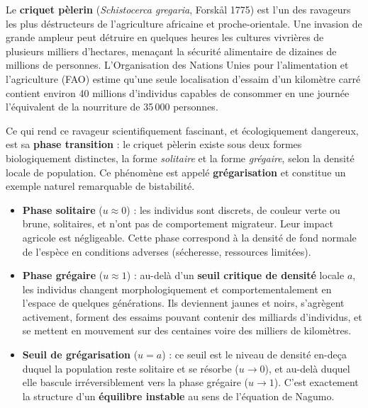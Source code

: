 \documentclass[11pt,a4paper]{report}
\begin{document}
Le \textbf{criquet p\`elerin} (\textit{Schistocerca gregaria}, Forsk\aa{}l 1775) est
l'un des ravageurs les plus d\'estructeurs de l'agriculture africaine et proche-orientale.
Une invasion de grande ampleur peut d\'etruire en quelques heures les cultures vivri\`eres
de plusieurs milliers d'hectares, mena\c{c}ant la s\'ecurit\'e alimentaire de dizaines de
millions de personnes. L'Organisation des Nations Unies pour l'alimentation et l'agriculture
(FAO) estime qu'une seule localisation d'essaim d'un kilom\`etre carr\'e contient environ
40 millions d'individus capables de consommer en une journ\'ee l'\'equivalent de la
nourriture de 35\,000 personnes.

Ce qui rend ce ravageur scientifiquement fascinant, et \'ecologiquement dangereux,
est sa \textbf{phase transition} : le criquet p\`elerin existe sous deux formes
biologiquement distinctes, la forme \emph{solitaire} et la forme \emph{gr\'egaire},
selon la densit\'e locale de population. Ce ph\'enom\`ene est appel\'e
\textbf{gr\'egarisation} et constitue un exemple naturel remarquable de bistabilit\'e.

\begin{itemize}[leftmargin=2em]
  \item \textbf{Phase solitaire} ($u \approx 0$) : les individus sont discrets,
        de couleur verte ou brune, solitaires, et n'ont pas de comportement migrateur.
        Leur impact agricole est n\'egligeable. Cette phase correspond \`a la densit\'e
        de fond normale de l'esp\`ece en conditions adverses (s\'echeresse, ressources
        limit\'ees).

  \item \textbf{Phase gr\'egaire} ($u \approx 1$) : au-del\`a d'un \textbf{seuil
        critique de densit\'e} locale $a$, les individus changent morphologiquement et
        comportementalement en l'espace de quelques g\'en\'erations. Ils deviennent
        jaunes et noirs, s'agr\`egent activement, forment des essaims pouvant contenir
        des milliards d'individus, et se mettent en mouvement sur des centaines voire
        des milliers de kilom\`etres.

  \item \textbf{Seuil de grégarisation} ($u = a$) : ce seuil est le niveau de densit\'e
        en-de\c{c}a duquel la population reste solitaire et se r\'esorbe ($u \to 0$),
        et au-del\`a duquel elle bascule irr\'eversiblement vers la phase gr\'egaire
        ($u \to 1$). C'est exactement la structure d'un \textbf{\'equilibre instable}
        au sens de l'\'equation de Nagumo.
\end{itemize}
\end{document}
